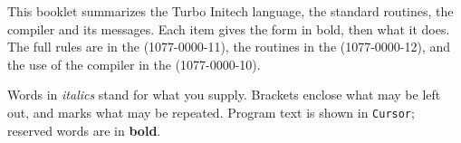 \IntroductionChapter

This booklet summarizes the Turbo Initech\reg{} language, the standard
routines, the compiler and its messages.  Each item gives the form in
bold, then what it does.  The full rules are in the  (1077-0000-11), the routines in the 
(1077-0000-12), and the use of the compiler in the 
(1077-0000-10).

Words in \textit{italics} stand for what you supply.  Brackets
\code{[ ]} enclose what may be left out, and  marks what may be
repeated.  Program text is shown in \texttt{Cursor}; reserved words are
in \textbf{bold}.
